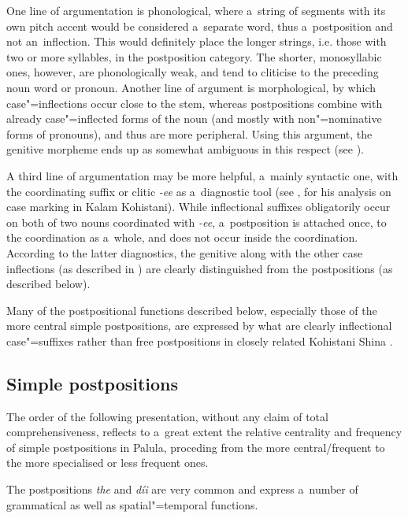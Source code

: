 One line of argumentation is phonological, where a~string of segments with its own pitch accent would be considered a~separate word, thus a~postposition and not an~inflection. This would definitely place the longer strings, i.e. those with two or more syllables, in the postposition category. The shorter, monosyllabic ones, however, are phonologically weak, and tend to cliticise to the preceding noun word or pronoun. Another line of argument is morphological, by which case"=inflections occur close to the stem, whereas postpositions combine with already case"=inflected forms of the noun (and mostly with non"=nominative forms of pronouns), and thus are more peripheral. Using this argument, the genitive morpheme ends up as somewhat ambiguous in this respect (see ).


A third line of argumentation may be more helpful, a~mainly syntactic one, with the coordinating suffix or clitic \textit{-ee} as a~diagnostic tool (see \citealt[77]{baart1999a}, for his analysis on case marking in Kalam Kohistani). While inflectional suffixes obligatorily occur on both of two nouns coordinated with \textit{-ee}, a~postposition is attached once, to the coordination as a~whole, and does not occur inside the coordination. According to the latter diagnostics, the genitive along with the other case inflections (as described in ) are clearly distinguished from the postpositions (as described below). 


Many of the postpositional functions described below, especially those of the more central simple postpositions, are expressed by what are clearly inflectional case"=suffixes rather than free postpositions in closely related Kohistani Shina \citep[115--130]{schmidtkohistani2001}. 


\subsection{Simple postpositions}
\label{subsec:7-2-2}

The order of the following presentation, without any claim of total comprehensiveness, reflects to a~great extent the relative centrality and frequency of simple postpositions in Palula, proceding from the more central/frequent to the more specialised or less frequent ones. 


The postpositions \textit{the} and \textit{díi} are very common and express a~number of grammatical as well as spatial"=temporal functions. 


